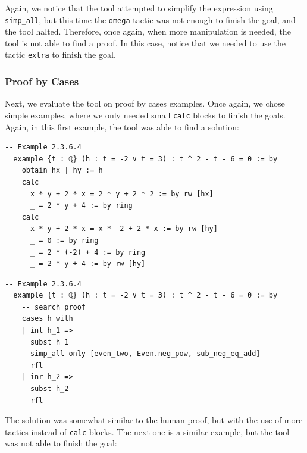 \documentclass[12pt]{article}
\newcommand{\leancopilot}{\texttt{LeanCopilot} }
\begin{document}
Again, we notice that the tool attempted to simplify the expression using \texttt{simp\_all}, but this time the \texttt{omega} tactic was not enough to finish the goal, and the tool halted. Therefore, once again, when more manipulation is needed, the tool is not able to find a proof. In this case, notice that we needed to use the tactic \texttt{extra} to finish the goal. 

\subsubsection{Proof by Cases}
Next, we evaluate the tool on proof by cases examples. Once again, we chose simple examples, where we only needed small \texttt{calc} blocks to finish the goals. Again, in this first example, the tool was able to find a solution:

\begin{minipage}{0.495\textwidth}
  \begin{lstlisting}[title={Human proof}]
  -- Example 2.3.6.4
  example {t : ℚ} (h : t = -2 ∨ t = 3) : t ^ 2 - t - 6 = 0 := by
    obtain hx | hy := h
    calc
      x * y + 2 * x = 2 * y + 2 * 2 := by rw [hx]
      _ = 2 * y + 4 := by ring
    calc
      x * y + 2 * x = x * -2 + 2 * x := by rw [hy]
      _ = 0 := by ring
      _ = 2 * (-2) + 4 := by ring
      _ = 2 * y + 4 := by rw [hy]
  \end{lstlisting}
\end{minipage}
\vline
\begin{minipage}{0.495\textwidth}
  \begin{lstlisting}[title={\leancopilot proof}]
  -- Example 2.3.6.4
  example {t : ℚ} (h : t = -2 ∨ t = 3) : t ^ 2 - t - 6 = 0 := by
    -- search_proof
    cases h with
    | inl h_1 =>
      subst h_1
      simp_all only [even_two, Even.neg_pow, sub_neg_eq_add]
      rfl
    | inr h_2 =>
      subst h_2
      rfl
  \end{lstlisting}
\end{minipage}

The solution was somewhat similar to the human proof, but with the use of more tactics instead of \texttt{calc} blocks. The next one is a similar example, but the tool was not able to finish the goal:
\end{document}

